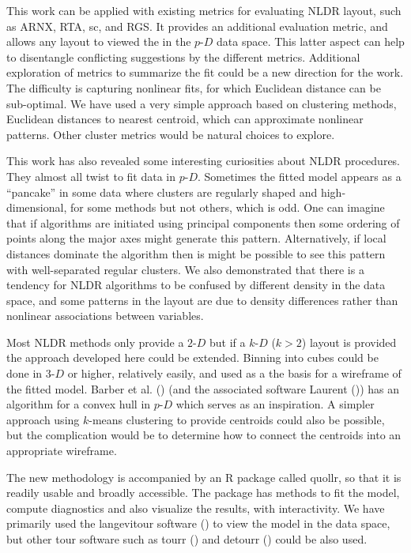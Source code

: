 \documentclass[
  11pt,
  a4paper,
]{report}
\newcommand\pD{$p\text{-}D$}
\newcommand\kD{$k\text{-}D$}
\newcommand\gD{$2\text{-}D$}
\begin{document}
This work can be applied with existing metrics for evaluating NLDR
layout, such as ARNX, RTA, sc, and RGS. It provides an additional
evaluation metric, and allows any layout to viewed the in the \pD{} data
space. This latter aspect can help to disentangle conflicting
suggestions by the different metrics. Additional exploration of metrics
to summarize the fit could be a new direction for the work. The
difficulty is capturing nonlinear fits, for which Euclidean distance can
be sub-optimal. We have used a very simple approach based on clustering
methods, Euclidean distances to nearest centroid, which can approximate
nonlinear patterns. Other cluster metrics would be natural choices to
explore.

This work has also revealed some interesting curiosities about NLDR
procedures. They almost all twist to fit data in \pD{}. Sometimes the
fitted model appears as a ``pancake'' in some data where clusters are
regularly shaped and high-dimensional, for some methods but not others,
which is odd. One can imagine that if algorithms are initiated using
principal components then some ordering of points along the major axes
might generate this pattern. Alternatively, if local distances dominate
the algorithm then is might be possible to see this pattern with
well-separated regular clusters. We also demonstrated that there is a
tendency for NLDR algorithms to be confused by different density in the
data space, and some patterns in the layout are due to density
differences rather than nonlinear associations between variables.

Most NLDR methods only provide a \gD{} but if a \kD{} (\(k>2\)) layout
is provided the approach developed here could be extended. Binning into
cubes could be done in \(3\text{-}D\) or higher, relatively easily, and
used as a the basis for a wireframe of the fitted model. Barber et al.
() (and the associated software Laurent
()) has an algorithm for a convex hull
in \pD{} which serves as an inspiration. A simpler approach using
\(k\)-means clustering to provide centroids could also be possible, but
the complication would be to determine how to connect the centroids into
an appropriate wireframe.

The new methodology is accompanied by an R package called quollr, so
that it is readily usable and broadly accessible. The package has
methods to fit the model, compute diagnostics and also visualize the
results, with interactivity. We have primarily used the langevitour
software () to view the model
in the data space, but other tour software such as tourr
() and detourr
() could be also used.
\end{document}
